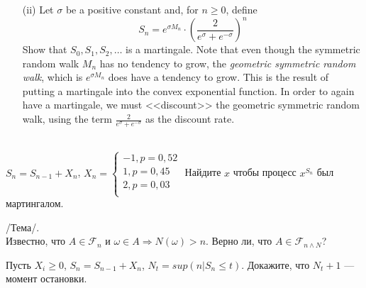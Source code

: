 \begin{solution}
\begin{solution}
\begin{solution}
\begin{solution}
\begin{solution}
\begin{solution}
\begin{solution}
\begin{solution}
\begin{solution}
{\begin{problem}
\begin{itemize}
\item[(ii)] Let $\sigma$ be a positive constant and, for $n\ge 0$, define
\[
S_n=e^{\sigma M_n}\cdot\left(\frac{2}{e^{\sigma}+e^{-\sigma}} \right)^n
\]
\ni Show that $S_0,S_1,S_2,\dots$ is a martingale. Note that even though the symmetric random
walk $M_n$ has no tendency to grow, the \emph{geometric symmetric random walk}, which is
$e^{\sigma M_n}$ does have a tendency to grow. This is the result of putting a martingale into
the convex exponential function. In order to again have a martingale, we must <<discount>> the
geometric symmetric random walk, using the term  $\frac{2}{e^{\sigma}+e^{-\sigma}}$ as the discount rate.
\end{itemize}
\end{problem} 
\begin{solution} 

\end{solution}

\begin{problem}
 [Steele, 2.1.] \\
$S_{n}=S_{n-1}+X_{n}$, 
$X_{n}= 
\begin{cases}
	-1, p=0,52 \\ 
	1, p=0,45 \\ 
	2, p=0,03 \\ 
\end{cases} $ 
Найдите $x$ чтобы процесс $x^{S_{n}}$ был мартингалом.
\end{problem} 
\begin{solution} 

\end{solution}

\begin{problem}
 /Тема/. \\
Известно, что $A\in\mathcal{F}_{n}$ и $\omega\in A \Rightarrow
N(\omega)>n$. Верно ли, что $A \in \mathcal{F}_{n\wedge N}$? 
\end{problem} 
\begin{solution} 

\end{solution}

\begin{problem}
Пусть $X_{i}\ge 0$, $S_{n}=S_{n-1}+X_{n}$, $N_{t}=sup(n|S_{n}\le
t)$. Докажите, что $N_{t}+1$ --- момент остановки. 
\end{problem} 
\begin{solution} 

\end{solution}

}
\end{solution}
\end{solution}
\end{solution}
\end{solution}
\end{solution}
\end{solution}
\end{solution}
\end{solution}
\end{solution}
